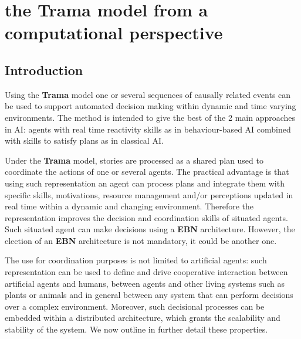 \documentclass[
		twoside,openright,titlepage,numbers=noenddot,manychapters,
		headinclude,%
                footinclude=false,cleardoublepage=empty,
                BCOR=5mm,
		fontsize=11pt, %
                 enabledeprecatedfontcommands]{scrreprt}
\begin{document}
%
%
%
%
%
%
%
%





\section{the Trama model from a computational perspective}

\subsection{Introduction}

Using the \textbf{Trama} model one or several sequences of causally related events can be used to support automated decision making within dynamic and time varying environments. The method is intended to give the best of the 2 main approaches in AI: agents with real time reactivity skills as in behaviour-based AI combined with skills to satisfy plans as in classical AI.


Under the \textbf{Trama} model, stories are processed as a shared plan used to coordinate the actions  of one or several agents. The practical advantage is that using such representation  an agent can process plans and integrate them with specific skills, motivations, resource management and/or perceptions updated in real time within a dynamic and changing environment. Therefore the representation improves the decision and coordination skills of situated agents. Such situated agent can make decisions using a \textbf{EBN} architecture. However, the election of an \textbf{EBN} architecture is not mandatory, it could be another one. 

The use  for coordination purposes is not limited to artificial agents: such representation can be used to define and drive cooperative interaction between artificial agents and humans, between agents and other living systems such as plants or animals and in general between any system that can perform decisions over a complex environment.  Moreover, such decisional processes can be embedded within a distributed architecture, which grants the scalability and stability of the system. We now outline in further detail these properties. 
\end{document}
